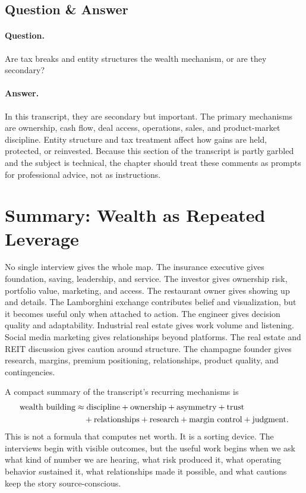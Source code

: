 \subsection{Question \& Answer}

\paragraph{Question.}
Are tax breaks and entity structures the wealth mechanism, or are they secondary?

\paragraph{Answer.}
In this transcript, they are secondary but important. The primary mechanisms are ownership, cash flow, deal access, operations, sales, and product-market discipline. Entity structure and tax treatment affect how gains are held, protected, or reinvested. Because this section of the transcript is partly garbled and the subject is technical, the chapter should treat these comments as prompts for professional advice, not as instructions.

\section{Summary: Wealth as Repeated Leverage}

No single interview gives the whole map. The insurance executive gives foundation, saving, leadership, and service. The investor gives ownership risk, portfolio value, marketing, and access. The restaurant owner gives showing up and details. The Lamborghini exchange contributes belief and visualization, but it becomes useful only when attached to action. The engineer gives decision quality and adaptability. Industrial real estate gives work volume and listening. Social media marketing gives relationships beyond platforms. The real estate and REIT discussion gives caution around structure. The champagne founder gives research, margins, premium positioning, relationships, product quality, and contingencies.

A compact summary of the transcript's recurring mechanisms is
\begin{align}
\hbox{wealth building}
&\approx
\hbox{discipline}
+\hbox{ownership}
+\hbox{asymmetry}
+\hbox{trust} \notag\\
&\quad
+\hbox{relationships}
+\hbox{research}
+\hbox{margin control}
+\hbox{judgment}.
\end{align}
This is not a formula that computes net worth. It is a sorting device. The interviews begin with visible outcomes, but the useful work begins when we ask what kind of number we are hearing, what risk produced it, what operating behavior sustained it, what relationships made it possible, and what cautions keep the story source-conscious.
